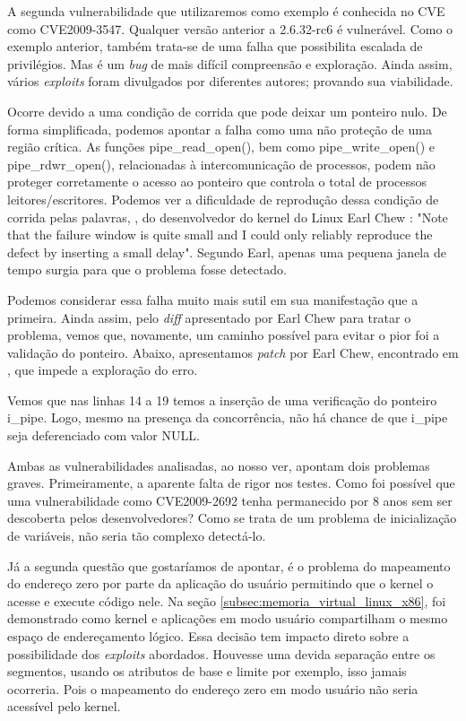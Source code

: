 			
			A segunda vulnerabilidade que utilizaremos como exemplo é conhecida no CVE como CVE2009-3547.
			Qualquer versão anterior a 2.6.32-rc6 é vulnerável.
			Como o exemplo anterior, também trata-se de uma falha que possibilita escalada de privilégios.
			Mas é um \textsl{bug} de mais difícil compreensão e exploração. Ainda assim, vários \textsl{exploits}
			foram divulgados por diferentes autores; provando sua viabilidade.

			
			Ocorre devido a uma condição de corrida que pode deixar	um ponteiro nulo. De forma simplificada,
			podemos apontar a falha como uma não proteção de uma região crítica. As funções
			pipe\_read\_open(), bem como pipe\_write\_open() e pipe\_rdwr\_open(), relacionadas à intercomunicação
			de processos, podem não proteger corretamente o acesso ao ponteiro que controla o total de
			processos leitores/escritores. Podemos ver a dificuldade de reprodução dessa condição de corrida pelas
			palavras, \cite{git_kernel_org_cve2009_3547}, do desenvolvedor do kernel do Linux Earl Chew :
			"Note that the failure window is quite small and I could only
			reliably reproduce the defect by inserting a small delay".
			Segundo Earl, apenas uma pequena janela de tempo surgia para que o problema fosse detectado.
			
	
			Podemos considerar essa falha muito mais sutil em sua manifestação que a primeira.
			Ainda assim, pelo \textsl{diff} apresentado por Earl Chew para tratar o problema,
			vemos que, novamente, um caminho possível para evitar o pior foi a validação do ponteiro.
			Abaixo, apresentamos \textsl{patch} por Earl Chew, encontrado em \cite{git_kernel_org_cve2009_3547}, 
			que impede a exploração do erro.
			
			Vemos que nas linhas 14 a 19 temos a inserção de uma verificação do ponteiro i\_pipe.
			Logo, mesmo na presença da concorrência, não há chance de que i\_pipe seja deferenciado com valor NULL.
			
			
			Ambas as vulnerabilidades analisadas, ao nosso ver, apontam dois problemas graves.
			Primeiramente, a aparente falta de rigor nos testes. Como foi possível
			que uma vulnerabilidade como CVE2009-2692 tenha permanecido por 8 anos sem ser descoberta
			pelos desenvolvedores? Como se trata de um problema de inicialização de variáveis,
			não seria tão complexo detectá-lo.
			
			
			Já a segunda questão que gostaríamos de apontar, é o problema do mapeamento do endereço
			zero por parte da aplicação do usuário permitindo que o kernel o acesse e execute
			código nele. Na seção \ref{subsec:memoria_virtual_linux_x86}, foi demonstrado como
			kernel e aplicações em modo usuário compartilham o mesmo espaço de endereçamento lógico.
			Essa decisão tem impacto direto sobre a possibilidade dos \textsl{exploits} abordados.
			Houvesse uma devida separação entre os segmentos, usando
			os atributos de base e limite por exemplo, isso jamais ocorreria. Pois o mapeamento
			do endereço zero em modo usuário não seria acessível pelo kernel.
			

